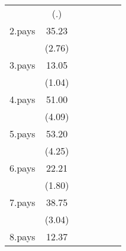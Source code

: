 {\begin{tabular}{l*{6}{c}}
                    &         (.)         &                     &                     &                     &                     &                     \\
[1em]
2.pays              &       35.23\sym{**} &                     &                     &                     &                     &                     \\
                    &      (2.76)         &                     &                     &                     &                     &                     \\
[1em]
3.pays              &       13.05         &                     &                     &                     &                     &                     \\
                    &      (1.04)         &                     &                     &                     &                     &                     \\
[1em]
4.pays              &       51.00\sym{***}&                     &                     &                     &                     &                     \\
                    &      (4.09)         &                     &                     &                     &                     &                     \\
[1em]
5.pays              &       53.20\sym{***}&                     &                     &                     &                     &                     \\
                    &      (4.25)         &                     &                     &                     &                     &                     \\
[1em]
6.pays              &       22.21         &                     &                     &                     &                     &                     \\
                    &      (1.80)         &                     &                     &                     &                     &                     \\
[1em]
7.pays              &       38.75\sym{**} &                     &                     &                     &                     &                     \\
                    &      (3.04)         &                     &                     &                     &                     &                     \\
[1em]
8.pays              &       12.37         &                     &                     &                     &                     &                     \\

\end{tabular}}
